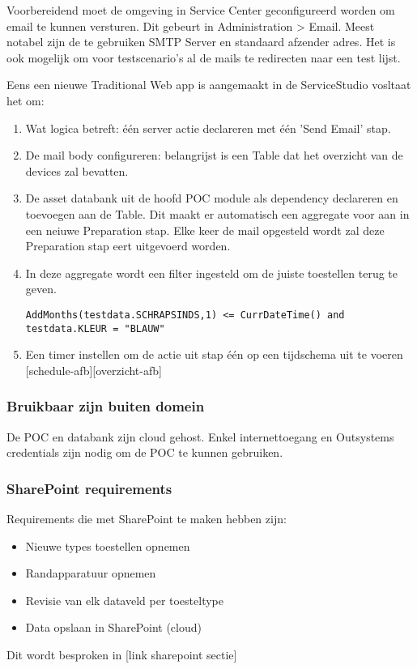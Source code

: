 Voorbereidend moet de omgeving in Service Center geconfigureerd worden om email te kunnen versturen. Dit gebeurt in Administration > Email. Meest notabel zijn de te gebruiken SMTP Server en standaard afzender adres. Het is ook mogelijk om voor testscenario's al de mails te redirecten naar een test lijst.

Eens een nieuwe Traditional Web app is aangemaakt in de ServiceStudio vosltaat het om:
\begin{enumerate}
    \item Wat logica betreft: één server actie declareren met één 'Send Email' stap.
    \item De mail body configureren: belangrijst is een Table dat het overzicht van de devices zal bevatten.
    \item De asset databank uit de hoofd POC module als dependency declareren en toevoegen aan de Table. Dit maakt er automatisch een aggregate voor aan in een neiuwe Preparation stap. Elke keer de mail opgesteld wordt zal deze Preparation stap eert uitgevoerd worden.
    \item In deze aggregate wordt een filter ingesteld om de juiste toestellen terug te geven.
\begin{lstlisting}
AddMonths(testdata.SCHRAPSINDS,1) <= CurrDateTime() and testdata.KLEUR = "BLAUW"
\end{lstlisting} 
    \item Een timer instellen om de actie uit stap één op een tijdschema uit te voeren [schedule-afb][overzicht-afb]
\end{enumerate}


\subsubsection{Bruikbaar zijn buiten domein}

De POC en databank zijn cloud gehost. Enkel internettoegang en Outsystems credentials zijn nodig om de POC te kunnen gebruiken.

\subsubsection{SharePoint requirements}

Requirements die met SharePoint te maken hebben zijn:
\begin{itemize}
    \item Nieuwe types toestellen opnemen
    \item Randapparatuur opnemen
    \item Revisie van elk dataveld per toesteltype
    \item Data opslaan in SharePoint (cloud)
\end{itemize}
Dit wordt besproken in [link sharepoint sectie]

